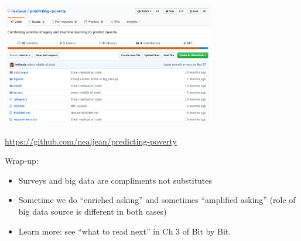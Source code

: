 \documentclass[aspectratio=169]{beamer}
\begin{document}
\begin{frame}

\begin{center}
\includegraphics[width=0.7\textwidth]{figures/jean_predicting_github}
\end{center}

\vfill
\url{https://github.com/nealjean/predicting-poverty}

\end{frame}
\begin{frame}

Wrap-up:
\begin{itemize}
\item Surveys and big data are compliments not substitutes
\pause
\item Sometime we do ``enriched asking'' and sometimes ``amplified asking'' (role of big data source is different in both cases)
\pause
\item Learn more: see ``what to read next'' in Ch 3 of Bit by Bit.
\end{itemize}

\end{frame}
\end{document}

